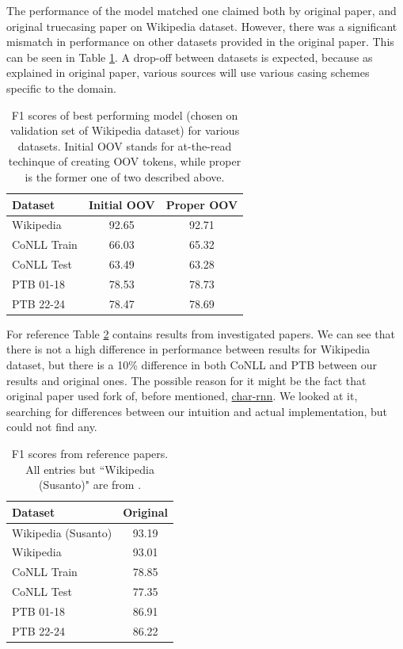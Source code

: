 \documentclass[11pt,a4paper]{article}
\begin{document}
    The performance of the model matched one claimed both by original paper, and original truecasing paper on Wikipedia dataset. However, there was a significant mismatch in performance on other datasets provided in the original paper. This can be seen in Table \ref{tab:truecase-result}. A drop-off between datasets is expected, because as explained in original paper, various sources will use various casing schemes specific to the domain.
    \begin{table}[h]
        \centering
        \begin{tabular}{|l|c|c|}
            \hline
            Dataset & Initial OOV & Proper OOV \\
            \hline
            Wikipedia & 92.65 & 92.71\\
            \hline
            \hline
            CoNLL Train & 66.03 & 65.32 \\
            \hline
            CoNLL Test & 63.49 & 63.28 \\
            \hline
            PTB 01-18 & 78.53 & 78.73 \\
            \hline
            PTB 22-24 & 78.47 & 78.69 \\
            \hline
        \end{tabular}
        \caption{F1 scores of best performing model (chosen on validation set of Wikipedia dataset) for various datasets. Initial OOV stands for at-the-read techinque of creating OOV tokens, while proper is the former one of two described above.}
        \label{tab:truecase-result}
    \end{table}
    For reference Table \ref{tab:trucase-original-result} contains results from investigated papers. We can see that there is not a high difference in performance between results for Wikipedia dataset, but there is a 10\% difference in both CoNLL and PTB between our results and original ones. The possible reason for it might be the fact that original paper used fork of, before mentioned, \href{https://github.com/karpathy/char-rnn}{char-rnn}. We looked at it, searching for differences between our intuition and actual implementation, but could not find any.
    \begin{table}[h]
        \centering
        \begin{tabular}{|l|c|}
            \hline
            Dataset & Original \\
            \hline
            Wikipedia (Susanto) & 93.19 \\
            \hline
            Wikipedia & 93.01 \\
            \hline
            \hline
            CoNLL Train & 78.85 \\
            \hline
            CoNLL Test & 77.35 \\
            \hline
            PTB 01-18 & 86.91 \\
            \hline
            PTB 22-24 & 86.22 \\
            \hline
        \end{tabular}
        \caption{F1 scores from reference papers. All entries but ``Wikipedia (Susanto)" are from \cite{ner-and-pos-original}.}
        \label{tab:trucase-original-result}
    \end{table}
\end{document}
